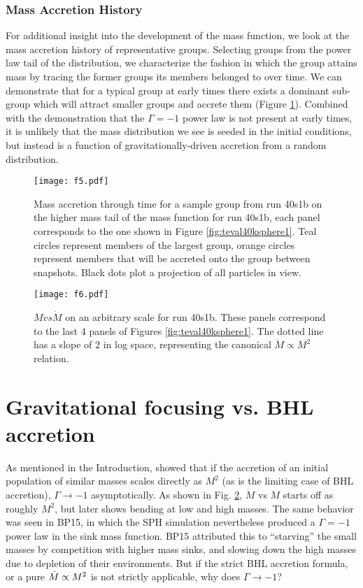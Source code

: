 \documentclass[iop]{emulateapj}
\begin{document}
\subsubsection{Mass Accretion History}
\par For additional insight into the development
of the mass function, we look at the mass accretion history of representative groups. Selecting groups from the power law tail of the distribution, we  characterize the fashion in which the group attains mass by tracing the former groups its members belonged to over time. We can demonstrate that for a typical group at early times there exists a dominant sub-group which will attract smaller groups and accrete them (Figure \ref{fig:accretion}).  Combined with the demonstration that the $\Gamma = -1$ power law is not present at early times, it is unlikely that the mass distribution we see is seeded in the initial conditions, but instead is a function of
gravitationally-driven accretion from a random
distribution.

\begin{figure}[h!]
    \centering
    \texttt{[image: f5.pdf]}
    \caption{Mass accretion through time for a sample group from run 40s1b on the higher mass tail of the mass function for run 40s1b, each panel corresponds to the one shown in Figure \ref{fig:teval40ksphere1}. Teal circles represent members of the largest group, orange circles represent members that will be accreted onto the group between snapshots. Black dots plot a projection of all particles in view.}
    \label{fig:accretion}
\end{figure}



\begin{figure}[h!]
    \centering
    \texttt{[image: f6.pdf]}
    \caption{ $M vs \dot{M}$ on an arbitrary scale for run 40s1b. These panels correspond to the last 4 panels of Figures \ref{fig:teval40ksphere1}. The dotted line has a slope of $2$ in log space, representing the canonical $\dot{M} \propto M^2$ relation. }
    \label{fig:mdot}
\end{figure}



\section{Gravitational focusing vs. BHL accretion}

As mentioned in the Introduction, \citet{zinnecker82} showed that if the accretion of an initial population of similar masses scales directly as $M^2$ (as is the limiting case
of BHL accretion), $\Gamma \rightarrow -1$
asymptotically.
 As shown in Fig. \ref{fig:mdot}, $\dot{M}$ vs $M$ starts off as roughly $M^2$, but later shows bending at low and high masses.
The same behavior was seen in BP15, in which the SPH simulation nevertheless produced a $\Gamma = -1$ power law in the sink mass function. BP15 attributed this to “starving” the small masses by competition with higher mass sinks, and slowing down the high masses due to depletion of their environments.
But if the strict BHL accretion formula, or a pure
$\dot{M} \propto M^2$ is not strictly applicable,
why does $\Gamma \rightarrow -1$?
\end{document}
